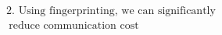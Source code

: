 \documentclass[preview]{standalone}
\begin{document}
\begin{align*}
2. \text{ Using fingerprinting, we can significantly} \\ \
                         \text{reduce communication cost}
\end{align*}
\end{document}
